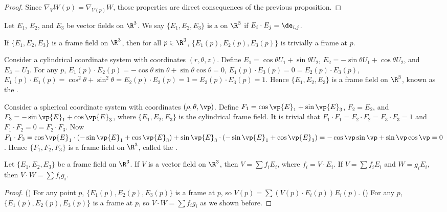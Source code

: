 \documentclass[10pt]{article}
\begin{document}
\begin{proof}
    Since ${\nabla}_{V}W(p)={\nabla}_{V(p)}W$, those properties are direct consequences of the previous proposition.
\end{proof}
\begin{definition}
    Let ${E}_{1}$, ${E}_{2}$, and ${E}_{3}$ be vector fields on ${\R}^{3}$. We say $\{{E}_{1},{E}_{2},{E}_{3}\}$ is a  on ${\R}^{3}$ if ${E}_{i}\cdot{E}_{j}={\de}_{i,j}$.
\end{definition}
\par
If $\{{E}_{1},{E}_{2},{E}_{3}\}$ is a frame field on ${\R}^{3}$, then for all $p\in{\R}^{3}$, $\{{E}_{1}(p),{E}_{2}(p),{E}_{3}(p)\}$ is trivially a frame at $p$.
\begin{example}
    Consider a cylindrical coordinate system with coordinates $(r,\theta,z)$. Define ${E}_{1}=\cos\theta{U}_{1}+\sin\theta{U}_{2}$, ${E}_{2}=-\sin\theta{U}_{1}+\cos\theta{U}_{2}$, and ${E}_{3}={U}_{3}$. For any $p$, ${E}_{1}(p)\cdot{E}_{2}(p)=-\cos\theta\sin\theta+\sin\theta\cos\theta=0$, ${E}_{1}(p)\cdot{E}_{3}(p)=0={E}_{2}(p)\cdot{E}_{3}(p)$, ${E}_{1}(p)\cdot{E}_{1}(p)={\cos}^{2}\theta+{\sin}^{2}\theta={E}_{2}(p)\cdot{E}_{2}(p)=1={E}_{3}(p)\cdot{E}_{3}(p)=1$. Hence $\{{E}_{1},{E}_{2},{E}_{3}\}$ is a frame field on ${\R}^{3}$, known as the .
\end{example}
\begin{example}
    Consider a spherical coordinate system with coordinates $(\rho,\theta,\vp)$. Define ${F}_{1}=\cos\vp{E}_{1}+\sin\vp{E}_{3}$, ${F}_{2}={E}_{2}$, and ${F}_{3}=-\sin\vp{E}_{1}+\cos\vp{E}_{3}$, where $\{{E}_{1},{E}_{2},{E}_{3}\}$ is the cylindrical frame field. It is trivial that ${F}_{1}\cdot{F}_{1}={F}_{2}\cdot{F}_{2}={F}_{3}\cdot{F}_{3}=1$ and ${F}_{1}\cdot{F}_{2}=0={F}_{2}\cdot{F}_{3}$. Now ${F}_{1}\cdot{F}_{3}=\cos\vp{E}_{1}\cdot(-\sin\vp{E}_{1}+\cos\vp{E}_{3})+\sin\vp{E}_{3}\cdot(-\sin\vp{E}_{1}+\cos\vp{E}_{3})=-\cos\vp\sin\vp+\sin\vp\cos\vp=0$. Hence $\{{F}_{1},{F}_{2},{F}_{3}\}$ is a frame field on ${\R}^{3}$, called the .
\end{example}
\begin{proposition}
    Let $\{{E}_{1},{E}_{2},{E}_{3}\}$ be a frame field on ${\R}^{3}$. If $V$ is a vector field on ${\R}^{3}$, then $V=\sum{f}_{i}{E}_{i}$, where ${f}_{i}=V\cdot{E}_{i}$. If $V=\sum{f}_{i}{E}_{i}$ and $W={g}_{i}{E}_{i}$, then $V\cdot W=\sum{f}_{i}{g}_{i}$.
\end{proposition}
\begin{proof}
    () For any point $p$, $\{{E}_{1}(p),{E}_{2}(p),{E}_{3}(p)\}$ is a frame at $p$, so $V(p)=\sum(V(p)\cdot{E}_{i}(p)){E}_{i}(p)$. () For any $p$, $\{{E}_{1}(p),{E}_{2}(p),{E}_{3}(p)\}$ is a frame at $p$, so $V\cdot W=\sum{f}_{i}{g}_{i}$ as we shown before.
\end{proof}
\end{document}

